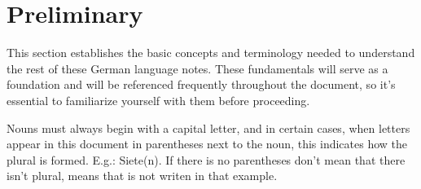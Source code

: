 \section{Preliminary}\label{sec:preliminary}

This section establishes the basic concepts and terminology needed to understand the rest of these German language notes. These fundamentals will serve as a foundation and will be referenced frequently throughout the document, so it's essential to familiarize yourself with them before proceeding.

Nouns must always begin with a capital letter, and in certain cases, when letters appear in this document in parentheses next to the noun, this indicates how the plural is formed. E.g.: Siete(n). If there is no parentheses don't mean that there isn't plural, means that is not writen in that example. 

{
\tableofcontents
}